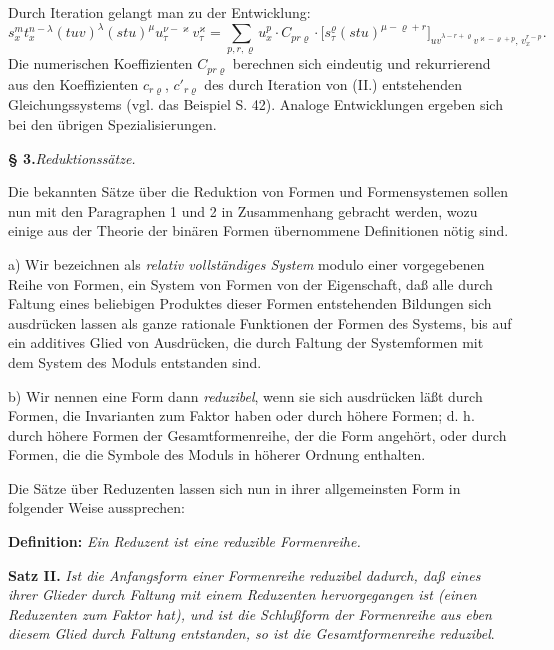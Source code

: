 Durch Iteration gelangt man zu der Entwicklung:
\[
\tag{III}
s_x^m t_x^{n-\lambda}(tuv)^\lambda(stu)^\mu u_\tau^{\nu-\varkappa}v_\tau^\varkappa
=
\sum_{p,r,\varrho}u_x^p\cdot C_{pr\varrho}\cdot
\bigl[s_\tau^\varrho(stu)^{\mu-\varrho+r}\bigr]_{\widehat{uv}^{\lambda-r+\varrho}v^{\varkappa-\varrho+p},\,v_x^{r-p}}.
\]
Die numerischen Koeffizienten $C_{pr\varrho}$ berechnen sich eindeutig und rekurrierend aus den Koeffizienten $c_{r\varrho}$, $c'_{r\varrho}$ des durch Iteration von (II.) entstehenden Gleichungssystems (vgl. das Beispiel S. 42). Analoge Entwicklungen ergeben sich bei den übrigen Spezialisierungen.

\begin{center}
\textbf{§ 3.}\quad \emph{Reduktionssätze.}
\end{center}

Die bekannten Sätze über die Reduktion von Formen und Formensystemen sollen nun mit den Paragraphen 1 und 2 in Zusammenhang gebracht werden, wozu einige aus der Theorie der binären Formen übernommene Definitionen nötig sind.

a) Wir bezeichnen als \emph{relativ vollständiges System} modulo einer vorgegebenen Reihe von Formen, ein System von Formen von der Eigenschaft, daß alle durch Faltung eines beliebigen Produktes dieser Formen entstehenden Bildungen sich ausdrücken lassen als ganze rationale Funktionen der Formen des Systems, bis auf ein additives Glied von Ausdrücken, die durch Faltung der Systemformen mit dem System des Moduls entstanden sind.

b) Wir nennen eine Form dann \emph{reduzibel}, wenn sie sich ausdrücken läßt durch Formen, die Invarianten zum Faktor haben oder durch \glqq{}höhere Formen\grqq{}; d. h. durch höhere Formen der Gesamtformenreihe, der die Form angehört, oder durch Formen, die die Symbole des Moduls in höherer Ordnung enthalten.

Die Sätze über Reduzenten lassen sich nun in ihrer allgemeinsten Form in folgender Weise aussprechen:

\textbf{Definition:} \emph{Ein Reduzent ist eine reduzible Formenreihe.}

\textbf{Satz II.} \emph{Ist die Anfangsform einer Formenreihe reduzibel dadurch, daß eines ihrer Glieder durch Faltung mit einem Reduzenten hervorgegangen ist (einen Reduzenten zum Faktor hat), und ist die Schlußform der Formenreihe aus eben diesem Glied durch Faltung entstanden, so ist die Gesamtformenreihe reduzibel}.


